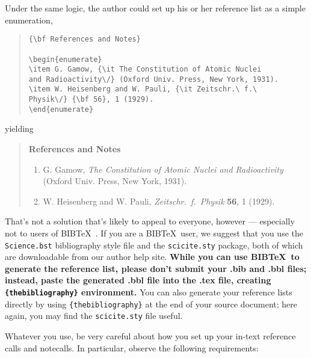 \documentclass[12pt]{article}
\begin{document}
Under the same logic, the author could set up his or her reference list as a simple enumeration,

\begin{quote}
\begin{verbatim}
{\bf References and Notes}

\begin{enumerate}
\item G. Gamow, {\it The Constitution of Atomic Nuclei
and Radioactivity\/} (Oxford Univ. Press, New York, 1931).
\item W. Heisenberg and W. Pauli, {\it Zeitschr.\ f.\ 
Physik\/} {\bf 56}, 1 (1929).
\end{enumerate}
\end{verbatim}
\end{quote}

\noindent yielding

\begin{quote}
{\bf References and Notes}

\begin{enumerate}
\item G. Gamow, {\it The Constitution of Atomic Nuclei and
Radioactivity\/} (Oxford Univ. Press, New York, 1931).
\item W. Heisenberg and W. Pauli, {\it Zeitschr.\ f.\ Physik} {\bf 56},
1 (1929).
\end{enumerate}
\end{quote}


That's not a solution that's likely to appeal to everyone, however ---
especially not to users of B{\small{IB}}\TeX\ \cite{inclme}.  If you
are a B{\small{IB}}\TeX\ user, we suggest that you use the
\texttt{Science.bst} bibliography style file and the
\texttt{scicite.sty} package, both of which are downloadable from our author help site.
{\bf While you can use B{\small{IB}}\TeX\ to generate the reference list, please don't submit 
your .bib and .bbl files; instead, paste the generated .bbl file into the .tex file, creating
 \texttt{\{thebibliography\}} environment.}
 You can also
generate your reference lists directly by using 
\texttt{\{thebibliography\}} at the end of your source document; here
again, you may find the \texttt{scicite.sty} file useful.

Whatever you use, be
very careful about how you set up your in-text reference calls and
notecalls.  In particular, observe the following requirements:
\end{document}
